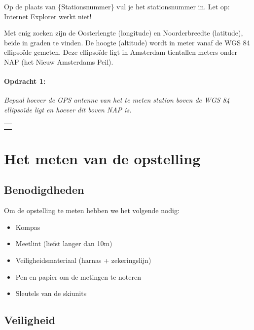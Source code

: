Op de plaats van \{Stationsnummer\} vul je het stationsnummer in. Let op: Internet Explorer werkt niet! 

Met enig zoeken zijn de Oosterlengte (longitude) en Noorderbreedte (latitude), beide in graden te vinden. De hoogte (altitude) wordt
in meter vanaf de WGS 84 ellipsoïde gemeten. Deze ellipsoïde ligt in Amsterdam tientallen meters onder NAP (het Nieuw Amsterdams Peil).

\begin{minipage}[t]{1\columnwidth}%

\paragraph{Opdracht 1:}

\textit{Bepaal hoever de GPS antenne van het te meten station boven
de WGS 84 ellipsoïde ligt en hoever dit boven NAP is.}

\begin{tabular}{>{\raggedright}p{16.6cm}}
\tabularnewline
\hline 
\tabularnewline
\hline 
\tabularnewline
\hline 
\tabularnewline
\hline 
\end{tabular}%
\end{minipage}


\section{Het meten van de opstelling}


\subsection{Benodigdheden}

Om de opstelling te meten hebben we het volgende nodig:
\begin{itemize}
\item Kompas
\item Meetlint (liefst langer dan 10m)
\item Veiligheidsmateriaal (harnas + zekeringslijn)
\item Pen en papier om de metingen te noteren
\item Sleutels van de skiunits
\end{itemize}

\subsection{Veiligheid}

